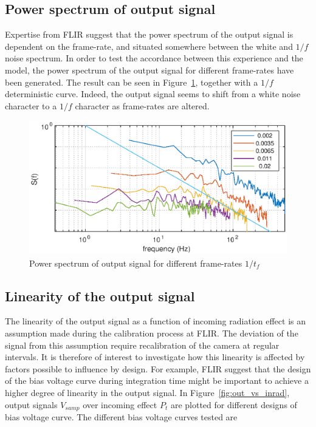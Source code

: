 \subsection{Power spectrum of output signal}
Expertise from FLIR suggest that the power spectrum of the output signal is dependent on the frame-rate, and situated somewhere between the white and $1/f$ noise spectrum.
In order to test the accordance between this experience and the model, the power spectrum of the output signal for different frame-rates have been generated. The result can be seen in
Figure~\ref{fig:pspec}, together with a $1/f$ deterministic curve. Indeed, the output signal seems to shift from a white noise character to a $1/f$ character as frame-rates are altered.
\begin{figure}[H]
 \begin{center}
\includegraphics[scale=0.9]{gfx/pspec.eps}
  \caption{Power spectrum of output signal for different frame-rates $1/t_f$}
  \label{fig:pspec}
  \end{center}
\end{figure}

\subsection{Linearity of the output signal}
The linearity of the output signal as a function of incoming radiation effect is an assumption made during the calibration process at FLIR. The deviation of the signal from this assumption
require recalibration of the camera at regular intervals. It is therefore of interest to investigate how this linearity is affected by factors possible to influence by design. For example, FLIR suggest that the design of the bias voltage curve during integration time might be important to achieve a higher degree of linearity in the output signal. In Figure~\ref{fig:out_vs_inrad}, output signals $V_{samp}$ over incoming effect $P_{t}$ are plotted for different designs of bias voltage curve. The different bias voltage curves tested are

